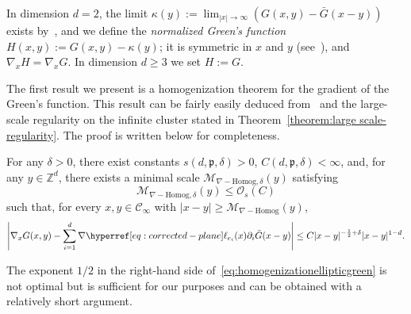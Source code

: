 \documentclass[12pt]{amsart}
\numberwithin{equation}{section}
\begin{document}
	In dimension $d = 2$, the limit $\kappa(y) := \lim_{|x| \to \infty} \left( G(x , y) - \bar G(x - y) \right)$ exists by~\cite[Theorem 2]{dario-gu-green}, and we define the \emph{normalized Green's function} $H(x , y) := G(x , y) - \kappa(y)$; it is symmetric in $x$ and $y$ (see~\cite[Section 5]{dario-gu-green}), and $\nabla_x H = \nabla_x G$. In dimension $d \geq 3$ we set $H := G$.

	The first result we present is a homogenization theorem for the gradient of the Green's function. This result can be fairly easily deduced from~\cite[Theorem 2]{dario-gu-green} and the large-scale regularity on the infinite cluster stated in Theorem~\ref{theorem:large scale-regularity}. The proof is written below for completeness. 
	
	\begin{prop} \label{prop:homogenizationellipticgreen}
		For any $\delta > 0$, there exist constants $s(d , \mathfrak{p}, \delta)> 0$, $C (d , \mathfrak{p}, \delta) < \infty$, and, for any $y \in \mathbb{Z}^d$, there exists a minimal scale $\mathcal{M}_{\nabla-\mathrm{Homog}, \delta}(y)$
		satisfying 
		\begin{equation*}
			\mathcal{M}_{\nabla-\mathrm{Homog}, \delta}(y) \leq \mathcal{O}_s(C)
		\end{equation*}
		such that, for every $x, y \in \mathscr{C}_\infty$ with $|x - y| \geq \mathcal{M}_{\nabla-\mathrm{Homog}}(y)$,
		\begin{equation} \label{eq:homogenizationellipticgreen}
			\left| \nabla_x G(x , y) - \sum_{i = 1}^d \nabla \ellp{e_i}(x) \partial_i \bar G(x - y) \right| \leq C |x-y|^{-\frac{1}{2}+\delta} |x - y|^{1-d}.
		\end{equation}	
	\end{prop}
	
	\begin{remark}
		The exponent $1/2$ in the right-hand side of~\eqref{eq:homogenizationellipticgreen} is not optimal but is sufficient for our purposes and can be obtained with a relatively short argument.
	\end{remark}
	
\end{document}

